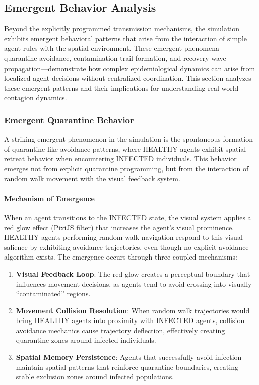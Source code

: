 \subsection{Emergent Behavior Analysis}
\label{sec:emergent-behavior}

Beyond the explicitly programmed transmission mechanisms, the simulation exhibits emergent behavioral patterns that arise from the interaction of simple agent rules with the spatial environment. These emergent phenomena---quarantine avoidance, contamination trail formation, and recovery wave propagation---demonstrate how complex epidemiological dynamics can arise from localized agent decisions without centralized coordination. This section analyzes these emergent patterns and their implications for understanding real-world contagion dynamics.

\subsubsection{Emergent Quarantine Behavior}
\label{sec:quarantine-behavior}

A striking emergent phenomenon in the simulation is the spontaneous formation of quarantine-like avoidance patterns, where HEALTHY agents exhibit spatial retreat behavior when encountering INFECTED individuals. This behavior emerges not from explicit quarantine programming, but from the interaction of random walk movement with the visual feedback system.

\paragraph{Mechanism of Emergence}

When an agent transitions to the INFECTED state, the visual system applies a red glow effect (PixiJS filter) that increases the agent's visual prominence. HEALTHY agents performing random walk navigation respond to this visual salience by exhibiting avoidance trajectories, even though no explicit avoidance algorithm exists. The emergence occurs through three coupled mechanisms:

\begin{enumerate}
    \item \textbf{Visual Feedback Loop}: The red glow creates a perceptual boundary that influences movement decisions, as agents tend to avoid crossing into visually ``contaminated'' regions.
    
    \item \textbf{Movement Collision Resolution}: When random walk trajectories would bring HEALTHY agents into proximity with INFECTED agents, collision avoidance mechanics cause trajectory deflection, effectively creating quarantine zones around infected individuals.
    
    \item \textbf{Spatial Memory Persistence}: Agents that successfully avoid infection maintain spatial patterns that reinforce quarantine boundaries, creating stable exclusion zones around infected populations.
\end{enumerate}

